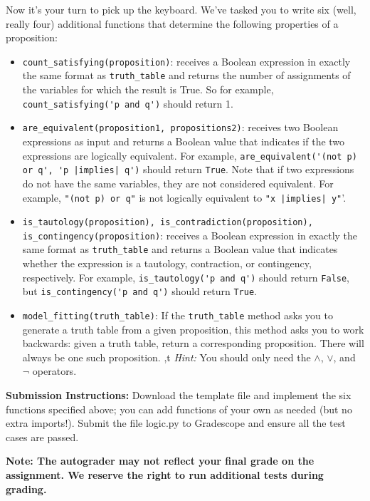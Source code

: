 \documentclass{article}
\begin{document}
    Now it's your turn to pick up the keyboard. We've tasked you to write six (well, really four) additional functions that determine the following properties of a proposition:
    \begin{itemize}
        \item \verb+count_satisfying(proposition)+: receives a Boolean expression in exactly the same format as \verb+truth_table+ and returns the number of assignments of the variables for which the result is True. So for example, \verb+count_satisfying('p and q')+ should return 1.
        \item \verb+are_equivalent(proposition1, propositions2)+: receives two Boolean expressions as input and returns a Boolean value that indicates if the two expressions are logically equivalent. For example, \verb+are_equivalent('(not p) or q', 'p |implies| q')+ should return \verb+True+. Note that if two expressions do not have the same variables, they are not considered equivalent. For example, \verb+"(not p) or q"+ is not logically equivalent to \verb+"x |implies| y"+'.
        \item \verb+is_tautology(proposition), is_contradiction(proposition), is_contingency(proposition)+: receives a Boolean expression in exactly the same format as \verb+truth_table+ and returns a Boolean value that indicates whether the expression is a tautology, contraction, or contingency, respectively. For example, \verb+is_tautology('p and q')+ should return \verb+False+, but \verb+is_contingency('p and q')+ should return \verb+True+.
        \item \verb+model_fitting(truth_table)+: If the \verb+truth_table+ method asks you to generate a truth table from a given proposition, this method asks you to work backwards: given a truth table, return a corresponding proposition. There will always be one such proposition.
,t
        \textit{Hint:} You should only need the $\land$, $\lor$, and $\neg$ operators.
    \end{itemize}

    \vspace{3mm}
    \textbf{Submission Instructions:} 
    Download the template file and implement the six functions specified above; you can add functions of your own as needed (but no extra imports!). Submit the file logic.py to Gradescope and ensure all the test cases are passed. 

    \vspace{3mm}
    \textbf{Note: The autograder may not reflect your final grade on the assignment. We reserve the right to run additional tests during grading.}
    
\end{document}
